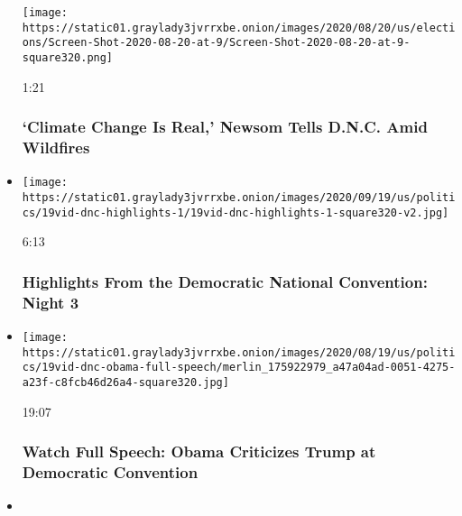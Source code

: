 \begin{itemize}
  \texttt{[image: https://static01.graylady3jvrrxbe.onion/images/2020/08/20/us/elections/Screen-Shot-2020-08-20-at-9/Screen-Shot-2020-08-20-at-9-square320.png]}

  1:21

  \hypertarget{climate-change-is-real-newsom-tells-dnc-amid-wildfires}{%
  \subsubsection{`Climate Change Is Real,' Newsom Tells D.N.C. Amid
  Wildfires}\label{climate-change-is-real-newsom-tells-dnc-amid-wildfires}}
\item
  \href{https://www.nytimes3xbfgragh.onion/video/us/politics/100000007297733/democratic-national-convention-highlights.html?action=click\&module=video-series-bar\&region=header\&pgtype=Article\&playlistId=video/2020-Elections}{}

  \texttt{[image: https://static01.graylady3jvrrxbe.onion/images/2020/09/19/us/politics/19vid-dnc-highlights-1/19vid-dnc-highlights-1-square320-v2.jpg]}

  6:13

  \hypertarget{highlights-from-the-democratic-national-convention-night-3}{%
  \subsubsection{Highlights From the Democratic National Convention:
  Night
  3}\label{highlights-from-the-democratic-national-convention-night-3}}
\item
  \href{https://www.nytimes3xbfgragh.onion/video/us/elections/100000007297653/barack-obama-full-speech-dnc.html?action=click\&module=video-series-bar\&region=header\&pgtype=Article\&playlistId=video/2020-Elections}{}

  \texttt{[image: https://static01.graylady3jvrrxbe.onion/images/2020/08/19/us/politics/19vid-dnc-obama-full-speech/merlin\_175922979\_a47a04ad-0051-4275-a23f-c8fcb46d26a4-square320.jpg]}

  19:07

  \hypertarget{watch-full-speech-obama-criticizes-trump-at-democratic-convention}{%
  \subsubsection{Watch Full Speech: Obama Criticizes Trump at Democratic
  Convention}\label{watch-full-speech-obama-criticizes-trump-at-democratic-convention}}
\item
  \href{https://www.nytimes3xbfgragh.onion/video/us/elections/100000007297654/kamala-harris-full-speech-dnc.html?action=click\&module=video-series-bar\&region=header\&pgtype=Article\&playlistId=video/2020-Elections}{}


\end{itemize}
